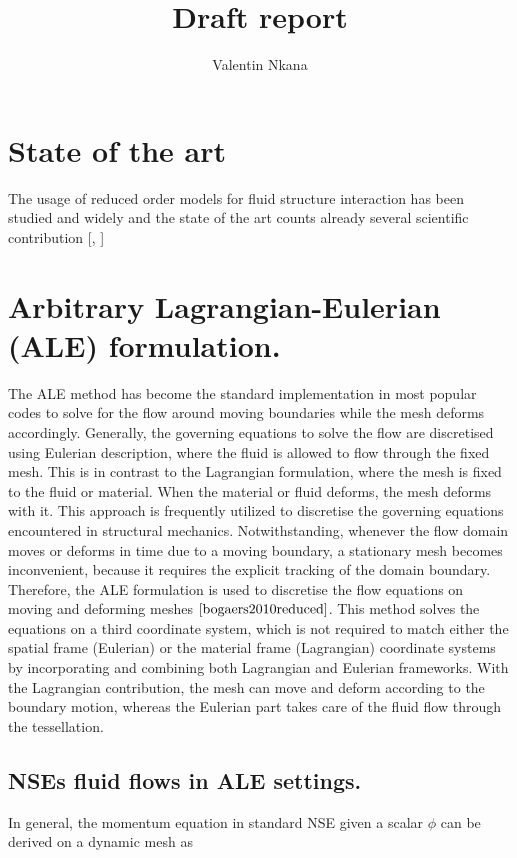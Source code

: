 \documentclass[10pt,a4paper,twoside]{article}
\author{Valentin Nkana}
\title{Draft report}
\begin{document}
	
\maketitle
\section{State of the art}
The usage of reduced order models for fluid structure interaction has been studied and widely and the state of the art counts already several scientific contribution [\cite{bogaers2010reduced}, \cite{shinde2019galerkin}]	
	
\section{Arbitrary Lagrangian-Eulerian (ALE) formulation.}
The ALE method has become the standard implementation in most popular codes to
solve for the flow around moving boundaries while the mesh deforms accordingly. Generally, the governing equations to solve the flow are discretised using Eulerian description, where the fluid is allowed to flow through the fixed mesh. This is in  contrast to the Lagrangian formulation, where the mesh is fixed to the fluid or material. When the material or fluid deforms, the mesh deforms with it. This approach is frequently utilized to discretise the governing equations encountered in structural mechanics. Notwithstanding, whenever the flow domain moves or deforms in time due to a moving boundary, a stationary mesh becomes inconvenient, because it requires the explicit tracking of the domain boundary. Therefore, the ALE formulation is used to discretise the flow equations on moving and deforming meshes $\cite{bogaers2010reduced}$. This method solves the equations on a third
coordinate system, which is not required to match either the spatial frame (Eulerian) or the material frame (Lagrangian)
 coordinate systems by incorporating and combining both Lagrangian and Eulerian frameworks. With the Lagrangian contribution, the mesh can move and deform according to the boundary motion, whereas the Eulerian part takes care of the fluid flow through the tessellation.

\subsection{NSEs fluid flows in ALE settings.}



In general, the momentum equation in standard NSE given  a scalar $\phi $ can be derived on a dynamic mesh as
\end{document}
